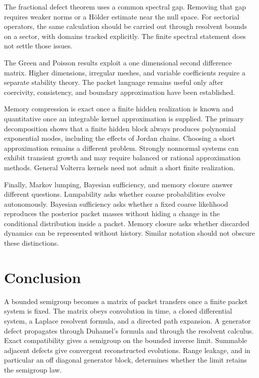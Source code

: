 \documentclass[11pt,a4paper]{article}
\theoremstyle{definition}
\theoremstyle{remark}
\begin{document}
The fractional defect theorem uses a common spectral gap. Removing that gap requires weaker norms or a Hölder estimate near the null space. For sectorial operators, the same calculation should be carried out through resolvent bounds on a sector, with domains tracked explicitly. The finite spectral statement does not settle those issues.

The Green and Poisson results exploit a one dimensional second difference matrix. Higher dimensions, irregular meshes, and variable coefficients require a separate stability theory. The packet language remains useful only after coercivity, consistency, and boundary approximation have been established.

Memory compression is exact once a finite hidden realization is known and quantitative once an integrable kernel approximation is supplied. The primary decomposition shows that a finite hidden block always produces polynomial exponential modes, including the effects of Jordan chains. Choosing a short approximation remains a different problem. Strongly nonnormal systems can exhibit transient growth and may require balanced or rational approximation methods. General Volterra kernels need not admit a short finite realization.

Finally, Markov lumping, Bayesian sufficiency, and memory closure answer different questions. Lumpability asks whether coarse probabilities evolve autonomously. Bayesian sufficiency asks whether a fixed coarse likelihood reproduces the posterior packet masses without hiding a change in the conditional distribution inside a packet. Memory closure asks whether discarded dynamics can be represented without history. Similar notation should not obscure these distinctions.

\section{Conclusion}\label{extended:section:19}\label{extended:sec:conclusion}

A bounded semigroup becomes a matrix of packet transfers once a finite packet system is fixed. The matrix obeys convolution in time, a closed differential system, a Laplace resolvent formula, and a directed path expansion. A generator defect propagates through Duhamel's formula and through the resolvent calculus. Exact compatibility gives a semigroup on the bounded inverse limit. Summable adjacent defects give convergent reconstructed evolutions. Range leakage, and in particular an off diagonal generator block, determines whether the limit retains the semigroup law.
\end{document}
